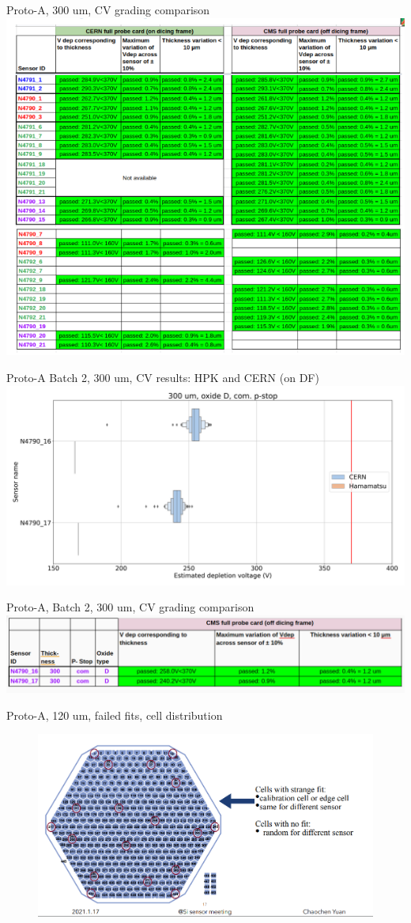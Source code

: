 \documentclass{beamer}
\begin{document}
\begin{frame}{Proto-A, 300 um, CV grading comparison}
  \includegraphics[width=.7\textwidth]{plots/CV_grading_300um.png}
\end{frame}

\begin{frame}{Proto-A Batch 2, 300 um, CV results: HPK and CERN (on DF)}
  \includegraphics[width=.8\textwidth]{plots/CV_ComparisonHPK_300um.png}
\end{frame}

\begin{frame}{Proto-A, Batch 2, 300 um, CV grading comparison}
  \includegraphics[width=.7\textwidth]{plots/CV_grading_300um_2.png}
\end{frame}

\begin{frame}{Proto-A, 120 um, failed fits, cell distribution}
  \begin{figure}
    \includegraphics[width=.9\textwidth]{plots/CV_Fit_Distribution.png}
  \end{figure}
\end{frame}
\end{document}
